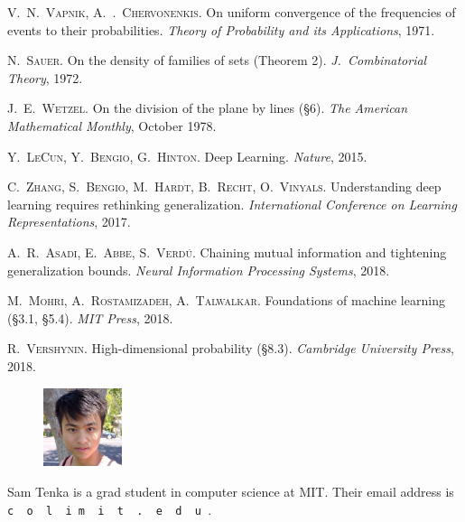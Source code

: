 \documentclass[twocolumn, 11pt]{article}
\theoremstyle{definition}
\begin{document}
        {
        \footnotesize
        \begin{thebibliography}{9}


            \textsc{V.\ N.\ Vapnik, A.\ .\ Chervonenkis}.
            On uniform convergence of the frequencies of events to their probabilities.
            \textit{Theory of Probability and its Applications}, 1971.

            \textsc{N.\ Sauer}.
            On the density of families of sets (Theorem 2).
            \textit{J.\ Combinatorial Theory}, 1972.

            \textsc{J.\ E.\ Wetzel}.
            On the division of the plane by lines (\S 6).
            \textit{The American Mathematical Monthly}, October 1978.

            \textsc{Y.\ LeCun, Y.\ Bengio, G.\ Hinton}.
            Deep Learning.
            \textit{Nature}, 2015.

            \textsc{C.\ Zhang, S.\ Bengio, M.\ Hardt, B.\ Recht, O.\ Vinyals}.
            Understanding deep learning requires rethinking generalization.
            \textit{International Conference on Learning Representations}, 2017.

            \textsc{A.\ R.\ Asadi, E.\ Abbe, S.\ Verd\'u}.
            Chaining mutual information and tightening generalization bounds.
            \textit{Neural Information Processing Systems}, 2018.

            \textsc{M.\ Mohri, A.\ Rostamizadeh, A.\ Talwalkar}.
            Foundations of machine learning (\S 3.1, \S 5.4).
            \textit{MIT Press}, 2018.

            \textsc{R.\ Vershynin}.
            High-dimensional probability (\S 8.3).
            \textit{Cambridge University Press}, 2018.

        \end{thebibliography}
        }

        \hrulefill
        \vspace{0.1cm}
            \begin{figure}
                \vspace{-0.4cm}
                    \includegraphics[height=2.3cm]{sam}
            \end{figure}
        \normalsize
        Sam Tenka is a grad student in computer science 
        at MIT.  Their email address is
        \texttt{
            c{\tiny\ }%
            o{\tiny\ }%
            l{\tiny\ }%
            i{\tiny@}%
            m{\tiny\ }%
            i{\tiny\ }%
            t{\tiny\ }%
            .{\tiny\ }%
            e{\tiny\ }%
            d{\tiny\ }%
            u%
        }.
\end{document}
